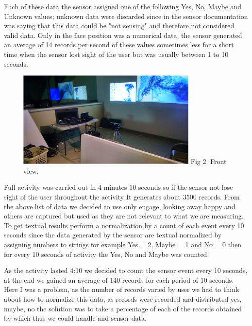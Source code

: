 \documentclass[journal]{IEEEtran}
\begin{document}
Each of these data the sensor assigned one of the following Yes, No, Maybe and Unknown values; unknown data were discarded since in the sensor documentation was saying that this data could be "not sensing" and therefore not considered valid data. Only in the face position was a numerical data, the sensor generated an average of 14 records per second of these values sometimes less for a short time when the sensor lost sight of the user  but was usually between 1 to 10 seconds. 


\begin{figure}[H]
	\centering
	\includegraphics [width=90mm]{tromp2.PNG}
	\label{fig:Figure 2}
	Fig 2. Front view.
\end{figure}

Full activity was carried out in 4 minutes 10 seconds so if the sensor not lose sight of the user throughout the activity It generates about 3500 records. From the above list of data we decided to use only engage, looking away happy and others are captured but used as they are not relevant to what we are measuring. To get textual results perform a normalization by a count of each event every 10 seconds since the data generated by the sensor are textual normalized by assigning numbers to strings for example Yes = 2, Maybe = 1 and No = 0 then for every 10 seconds of activity the Yes, No and Maybe was counted.

As the activity lasted 4:10 we decided to count the sensor event every 10 seconds, at the end we gained an average of 140 records for each period of 10 seconds. Here I was a problem, as the number of records varied by user we had to think about how to normalize this data, as records were recorded and distributed yes, maybe, no the solution was to take a percentage of each of the records obtained by which thus we could handle and sensor data.
\end{document}
